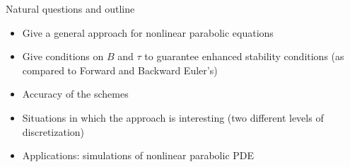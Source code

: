 \documentclass[hyperref={pdfpagemode=FullScreen},9pt]{beamer}
\begin{document}
%
\begin{frame}
\begin{block}{Natural questions and outline}
\begin{itemize}
\item Give a general approach for nonlinear parabolic equations
\item Give conditions on $B$ and $\tau$ to guarantee enhanced stability conditions (as compared to Forward and Backward Euler's)
\item Accuracy of the schemes
\item Situations in which the approach is interesting (two different levels of discretization)
\item Applications: simulations of nonlinear parabolic PDE
\end{itemize}
\end{block}
\end{frame}
\end{document}
